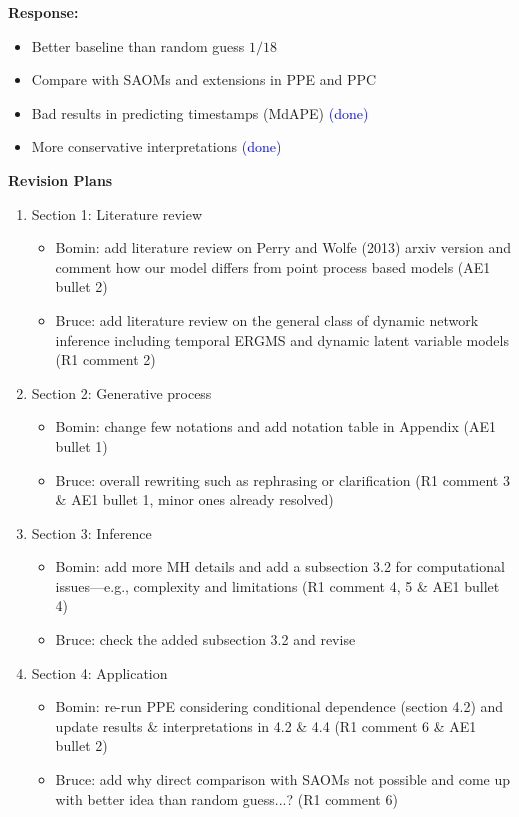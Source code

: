 \documentclass[12pt]{article}
\theoremstyle{definition}
\begin{document}
\begin{itemize}
\textbf{  Response:} 
\begin{itemize}
	\item Better baseline than random guess $1/18$ 
	\item Compare with SAOMs and extensions in PPE and PPC 
	\item Bad results in predicting timestamps (MdAPE)  \textcolor{blue}{(done)}
	\item More conservative interpretations \textcolor{blue}{(done)}
\end{itemize}
\end{itemize}

\newpage
\begin{center}
	
	\textbf{Revision Plans}
\end{center}
\begin{enumerate}
	\item Section 1: Literature review
	\begin{itemize}
		\item Bomin: add literature review on Perry and Wolfe (2013) arxiv version and comment how our model differs from point process based models (AE1 bullet 2)
		\item Bruce: add literature review on the general class of dynamic network inference including temporal ERGMS and dynamic latent variable models (R1 comment 2)
	\end{itemize}
	\item Section 2: Generative process
		\begin{itemize}
			\item Bomin: change few notations and add notation table in Appendix (AE1 bullet 1)
			\item Bruce: overall rewriting such as rephrasing or clarification (R1 comment 3 \& AE1 bullet 1, minor ones already resolved)
		\end{itemize}
			\item Section 3: Inference
			\begin{itemize}
		\item Bomin: add more MH details and add a subsection 3.2 for computational issues---e.g., complexity and limitations (R1 comment 4, 5 \& AE1 bullet 4)
				\item Bruce: check the added subsection 3.2 and revise
			\end{itemize}
			\item Section 4: Application
			\begin{itemize}
				\item Bomin: re-run PPE considering conditional dependence (section 4.2) and update results \& interpretations in 4.2 \& 4.4 (R1 comment 6 \& AE1 bullet 2)
				\item Bruce: add why direct comparison with SAOMs not possible and come up with better idea than random guess...? (R1 comment 6)
			\end{itemize}			
	

\end{enumerate}
\end{document}
